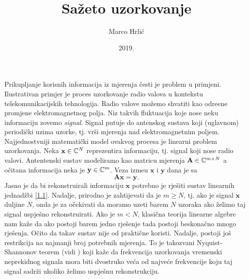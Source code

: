 \documentclass[a4paper,twoside,12pt]{memoir} %
\title{Sa\v{z}eto uzorkovanje}
\author{Marco Hrli\'c}
\date{2019.}  %
\newcommand{\vect}[1]{\mathbf{#1}}
\renewcommand{\vec}{\vect}
\begin{document}
\setlength\abovedisplayskip{10pt}
\setlength\belowdisplayskip{10pt}
\setlength\abovedisplayshortskip{10pt}
\setlength\belowdisplayshortskip{10pt}

\nocite{*}

\frontmatter


\begin{intro}
    Prikupljanje korisnih informacija iz mjerenja \v{c}esti je problem u primjeni. Ilustrativan primjer je proces uzorkovanje radio valova u kontekstu telekomunikacijskih tehnologija. Radio valove mo\v{z}emo shvatiti kao odre\dj ene promjene elektromagnetnog polja. Niz takvih fluktuacija koje nose neku informaciju zovemo \textit{signal}. Signal putuje do antenskog sustava koji (uglavnom) periodi\v{c}ki uzima uzorke, tj. vr\v{s}i mjerenja nad elektromagnetnim poljem. Najjednostvniji matemati\v{c}ki model ovakvog procesa je linearni problem uzorkovanja. Neka $\vec x \in \C^N$ reprezentira informaciju, tj. signal koji nose radio valovi. Antentenski sustav modeliramo kao matricu mjerenja $\vec A \in \C^{m \times N}$ a o\v{c}itana informacija neka je $\vec y \in \C^m$. Veza izme\dj u $\vec x$ i $\vec y$ dana je sa
    \begin{equation}\label{1.1}
        \vec{Ax} = \vec{y}. 
    \end{equation}
    Jasno je da bi rekonstruirali informaciju $\vec x$ potrebno je rje\v{s}iti sustav linearnih jednad\v{z}bi \eqref{1.1}. Nadalje, prirodno je zahtijevati da je $m \geq N$, tj. ako je signal $\vec x$ duljine $N$, onda je za o\v{c}ekivati da moramo uzeti barem $N$ uzoraka ako \v{z}elimo taj signal uspje\v{s}no rekonstruirati. Ako je $m < N$, klasi\v{c}na teorija linearne algebre nam ka\v{z}e da ako postoji barem jedno rje\v{s}enje tada postoji beskona\v{c}no mnogo rje\v{s}enja. O\v{c}ito da takav sustav nije od prakti\v{c}ne koristi. Nadalje, postoji jo\v{s} restrikcija na najmanji broj potrebnih mjerenja. To je takozvani Nyquist-Shannonov teorem (vidi \cite{shannon1949}) koji ka\v{z}e da frekvencija uzorkovanja vremenski neprekidnog signala mora biti dvostruko ve\'ca od najve\'ce frekvencije koju taj signal sadr\v{z}i ukoliko \v{z}elimo uspje\v{s}nu rekonstrukciju. \\
    \indent

\end{intro}
\end{document}

